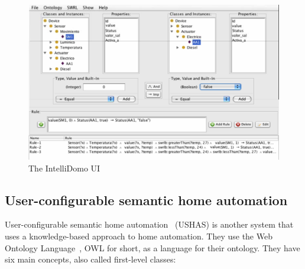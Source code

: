 \documentclass[11pt,a4paper]{report}
\begin{document}
\begin{figure}
    \centering
    \includegraphics[width=0.8\linewidth]{images/IntelliDomo_UI.png}
    \caption{The IntelliDomo UI~\cite{SOTA_OntologyBased}}
    \label{fig:IntelliDomo_UI}
\end{figure}

\subsection{User-configurable semantic home automation}
\label{USHAS}
User-configurable semantic home automation~\cite{SOTA_AutomationConfigurationSmarthome} (USHAS) is another system that uses a knowledge-based approach to home automation. They use the Web Ontology Language~\cite{OWL}, OWL for short, as a language for their ontology. They have six main concepts, also called first-level classes:
\end{document}
